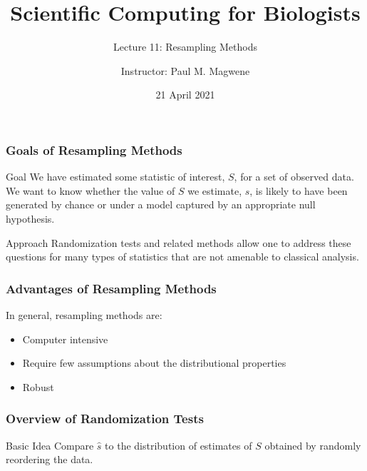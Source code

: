 \documentclass{beamer}
\title{Scientific Computing for Biologists}
\subtitle{Lecture 11: Resampling Methods} %
\author{Instructor: Paul M. Magwene}
\date{21 April 2021}
\begin{document}
\begin{frame}
\titlepage
\end{frame}



\begin{frame}
  \frametitle{Goals of Resampling Methods}

\begin{block}{Goal}
We have estimated some statistic of interest, $S$, for a set of observed data. We want to know whether the value of $S$ we estimate, $\widehat{s}$, is likely to have been generated by chance or under a model captured by an appropriate null hypothesis.
\end{block}


\begin{block}{Approach}
Randomization tests and related methods allow one to address these questions for many types of statistics that are not amenable to classical analysis.
\end{block}



\end{frame}


\begin{frame}
  \frametitle{Advantages of Resampling Methods}


In general, resampling methods are:
\begin{itemize}
    \item Computer intensive
    \item Require few assumptions about the distributional properties
    \item Robust
\end{itemize}

\end{frame}

\begin{frame}
  \frametitle{Overview of Randomization Tests}

\begin{block}{Basic Idea}
Compare $\widehat{s}$ to the distribution of estimates of $S$ obtained by randomly reordering the data.
\end{block}

\end{frame}
\end{document}
